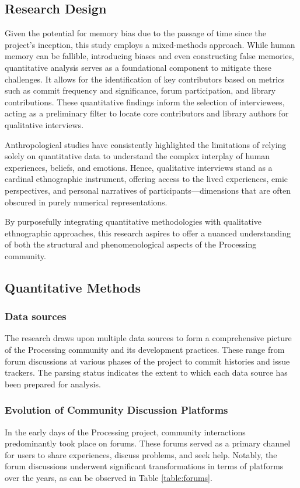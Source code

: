 \documentclass{article}
\begin{document}
\subsection{Research Design}
Given the potential for memory bias due to the passage of time since the project's inception, this study employs a mixed-methods approach. While human memory can be fallible, introducing biases and even constructing false memories, quantitative analysis serves as a foundational component to mitigate these challenges. It allows for the identification of key contributors based on metrics such as commit frequency and significance, forum participation, and library contributions. These quantitative findings inform the selection of interviewees, acting as a preliminary filter to locate core contributors and library authors for qualitative interviews.

Anthropological studies have consistently highlighted the limitations of relying solely on quantitative data to understand the complex interplay of human experiences, beliefs, and emotions. Hence, qualitative interviews stand as a cardinal ethnographic instrument, offering access to the lived experiences, emic perspectives, and personal narratives of participants—dimensions that are often obscured in purely numerical representations.

By purposefully integrating quantitative methodologies with qualitative ethnographic approaches, this research aspires to offer a nuanced understanding of both the structural and phenomenological aspects of the Processing community.

\subsection{Quantitative Methods}
\subsubsection*{Data sources}

The research draws upon multiple data sources to form a comprehensive picture of the Processing community and its development practices. These range from forum discussions at various phases of the project to commit histories and issue trackers. The parsing status indicates the extent to which each data source has been prepared for analysis. 
        

\subsubsection*{Evolution of Community Discussion Platforms}
In the early days of the Processing project, community interactions predominantly took place on forums. These forums served as a primary channel for users to share experiences, discuss problems, and seek help. Notably, the forum discussions underwent significant transformations in terms of platforms over the years, as can be observed in Table \ref{table:forums}. \parencite{ProcessingForum}
\end{document}
